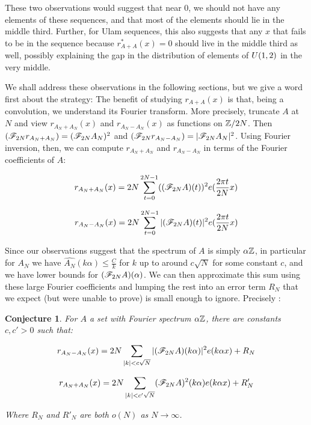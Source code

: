 \documentclass{report}
\newtheorem{conjecture}[theorem]{Conjecture}
\theoremstyle{remark}
\numberwithin{equation}{section}
\begin{document}
These two observations would suggest that near 0, we should not have
any elements of these sequences, and that most of the elements should
lie in the middle third.  Further, for Ulam sequences, this also
suggests that any $x$ that fails to be in the sequence because
$r^*_{A+A}(x) = 0$ should live in the middle third as well, possibly
explaining the gap in the distribution of elements of $U(1,2)$ in the
very middle.  

We shall address these observations in the following sections, but we
give a word first about the strategy: The benefit of studying
$r_{A+A}(x)$ is that, being a convolution, we understand its Fourier
transform.  More precisely, truncate $A$ at $N$ and view
$r_{A_N + A_N}(x)$ and $r_{A_N - A_N}(x)$ as functions on $\mathbb{Z}/2N$.
Then $(\mathscr{F}_{2N}r_{A_N + A_N}) = (\mathscr{F}_{2N}A_N)^2$ and
$(\mathscr{F}_{2N}r_{A_N - A_N}) = |\mathscr{F}_{2N}A_N|^2$.  Using Fourier
inversion, then, we can compute $r_{A_N + A_N}$ and $r_{A_N - A_N}$ in
terms of the Fourier coefficients of $A$:

\begin{equation}\label{eqn:rAAsum}r_{A_N + A_N}(x) = 2N \sum_{t=0}^{2N-1} ((\mathscr{F}_{2N}A)(t))^2 e(\frac{2\pi t}{2N} x)\end{equation}

\begin{equation}\label{eqn:rAAdiff}r_{A_N - A_N}(x) = 2N \sum_{t=0}^{2N-1} |(\mathscr{F}_{2N}A)(t)|^2 e(\frac{2\pi t}{2N} x)\end{equation}

Since our observations suggest that the spectrum of $A$ is simply
$\alpha\mathbb{Z}$, in particular for $A_N$ we have
$\widehat{A_N}(k\alpha) \leq \frac{C}{k}$ for $k$ up to around
$c\sqrt{N}$ for some constant $c$, and we have lower bounds for
$(\mathscr{F}_{2N}A)(\alpha)$.  We can then approximate this sum using these
large Fourier coefficients and lumping the rest into an error term
$R_N$ that we expect (but were unable to prove) is small enough to
ignore.  Precisely : 


\begin{conjecture}\label{conj:spec_estimate}
  For $A$ a \relevant set with Fourier spectrum $\alpha\mathbb{Z}$, there are
  constants $c, c' > 0$ such that:

\begin{equation}\label{eqn:rAAdiff_err}
  r_{A_N - A_N}(x) = 2N\sum_{|k| < c\sqrt{N}} |(\mathscr{F}_{2N}A)(k\alpha)|^2 e(k\alpha x) + R_N
\end{equation}

\begin{equation}\label{eqn:rAAsum_err}
  r_{A_N + A_N}(x) = 2N\sum_{|k| < c'\sqrt{N}}(\mathscr{F}_{2N}A)^2(k \alpha) e(k\alpha x) + R'_N
\end{equation}
  
Where $R_N$ and $R'_N$ are both $o(N)$ as $N \to \infty$.  
\end{conjecture}
\end{document}
